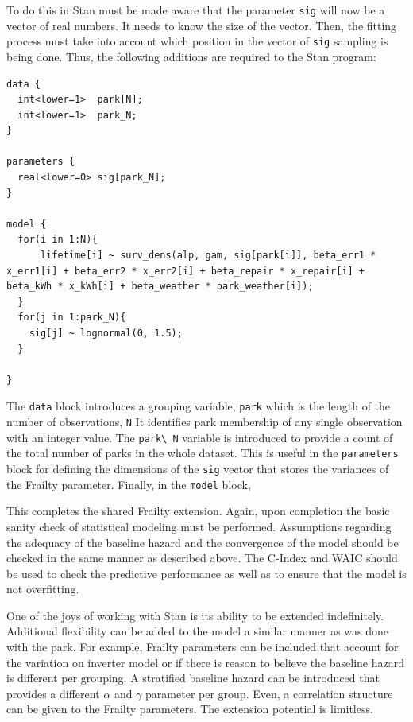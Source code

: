 To do this in Stan must be made aware that the parameter \lstinline{sig} will now be a vector of real numbers. It needs to know the size of the vector. Then, the fitting process must take into account which position in the vector of \lstinline{sig} sampling is being done. Thus, the following additions are required to the Stan program:


\begin{lstlisting}
data {
  int<lower=1>  park[N];
  int<lower=1>  park_N;
}

parameters {
  real<lower=0> sig[park_N];
}

model {
  for(i in 1:N){
      lifetime[i] ~ surv_dens(alp, gam, sig[park[i]], beta_err1 * x_err1[i] + beta_err2 * x_err2[i] + beta_repair * x_repair[i] + beta_kWh * x_kWh[i] + beta_weather * park_weather[i]);
  }
  for(j in 1:park_N){
    sig[j] ~ lognormal(0, 1.5);
  }

}
\end{lstlisting}


The \lstinline{data} block introduces a grouping variable, \lstinline{park} which is the length of the number of observations, \lstinline{N} It identifies  park membership of any single observation with an integer value. The \lstinline{park\_N} variable is introduced to provide a count of the total number of parks in the whole dataset. This is useful in the \lstinline{parameters} block for defining the dimensions of the \lstinline{sig} vector that stores the variances of the Frailty parameter. Finally, in the \lstinline{model} block, 

This completes the shared Frailty extension. Again, upon completion the basic sanity check of statistical modeling must be performed. Assumptions regarding the adequacy of the baseline hazard and the convergence of the model should be checked in the same manner as described above. The C-Index and WAIC should be used to check the predictive performance as well as to ensure that the model is not overfitting. 

One of the joys of working with Stan is its ability to be extended indefinitely. Additional flexibility can be added to the model a similar manner as was done with the park. For example, Frailty parameters can be included that account for the variation on inverter model or if there is reason to believe the baseline hazard is different per grouping. A stratified baseline hazard can be introduced that provides a different $\alpha$ and $\gamma$ parameter per group. Even, a correlation structure can be given to the Frailty parameters. The extension potential is limitless. 








